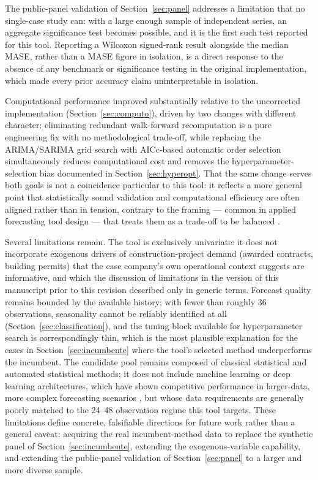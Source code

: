 \documentclass[forecasting,article,submit,pdftex,moreauthors]{Definitions/mdpi}
\begin{document}
The public-panel validation of Section~\ref{sec:panel} addresses a limitation that no single-case study can: with a large enough sample of independent series, an aggregate significance test becomes possible, and it is the first such test reported for this tool. Reporting a Wilcoxon signed-rank result alongside the median MASE, rather than a MASE figure in isolation, is a direct response to the absence of any benchmark or significance testing in the original implementation, which made every prior accuracy claim uninterpretable in isolation.

Computational performance improved substantially relative to the uncorrected implementation (Section~\ref{sec:computo}), driven by two changes with different character: eliminating redundant walk-forward recomputation is a pure engineering fix with no methodological trade-off, while replacing the ARIMA/SARIMA grid search with AICc-based automatic order selection simultaneously reduces computational cost and removes the hyperparameter-selection bias documented in Section~\ref{sec:hyperopt}. That the same change serves both goals is not a coincidence particular to this tool: it reflects a more general point that statistically sound validation and computational efficiency are often aligned rather than in tension, contrary to the framing --- common in applied forecasting tool design --- that treats them as a trade-off to be balanced \cite{petropoulos2022}.

Several limitations remain. The tool is exclusively univariate: it does not incorporate exogenous drivers of construction-project demand (awarded contracts, building permits) that the case company's own operational context suggests are informative, and which the discussion of limitations in the version of this manuscript prior to this revision described only in generic terms. Forecast quality remains bounded by the available history; with fewer than roughly 36 observations, seasonality cannot be reliably identified at all (Section~\ref{sec:classification}), and the tuning block available for hyperparameter search is correspondingly thin, which is the most plausible explanation for the cases in Section~\ref{sec:incumbente} where the tool's selected method underperforms the incumbent. The candidate pool remains composed of classical statistical and automated statistical methods; it does not include machine learning or deep learning architectures, which have shown competitive performance in larger-data, more complex forecasting scenarios \cite{carbonneau2008}, but whose data requirements are generally poorly matched to the 24--48 observation regime this tool targets. These limitations define concrete, falsifiable directions for future work rather than a general caveat: acquiring the real incumbent-method data to replace the synthetic panel of Section~\ref{sec:incumbente}, extending the exogenous-variable capability, and extending the public-panel validation of Section~\ref{sec:panel} to a larger and more diverse sample.
\end{document}

